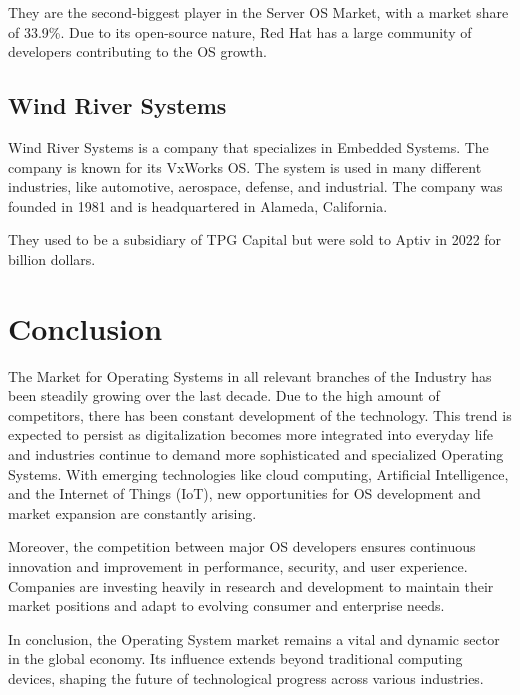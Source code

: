 They are the second-biggest player in the Server OS Market, with a market share of 33.9\%. 
Due to its open-source nature, Red Hat has a large community of developers contributing to the OS growth.

\cite{RedHatWiki}

\subsection{Wind River Systems}

Wind River Systems is a company that specializes in Embedded Systems. The company is known for its VxWorks OS. The system is used in many different industries, like automotive, aerospace, defense, and industrial.
The company was founded in 1981 and is headquartered in Alameda, California.

They used to be a subsidiary of TPG Capital but were sold to Aptiv in 2022 for  billion dollars.

\cite{WindriverSold}


\section{Conclusion}

The Market for Operating Systems in all relevant branches of the Industry has been steadily growing over the last decade.
Due to the high amount of competitors, there has been constant development of the technology. 
This trend is expected to persist as digitalization becomes more integrated into everyday life and industries continue to demand more sophisticated and specialized Operating Systems. With emerging technologies like cloud computing, Artificial Intelligence, and the Internet of Things (IoT), new opportunities for OS development and market expansion are constantly arising.

Moreover, the competition between major OS developers ensures continuous innovation and improvement in performance, security, and user experience. Companies are investing heavily in research and development to maintain their market positions and adapt to evolving consumer and enterprise needs.

In conclusion, the Operating System market remains a vital and dynamic sector in the global economy. Its influence extends beyond traditional computing devices, shaping the future of technological progress across various industries.

\author{Florian Prandstetter}
